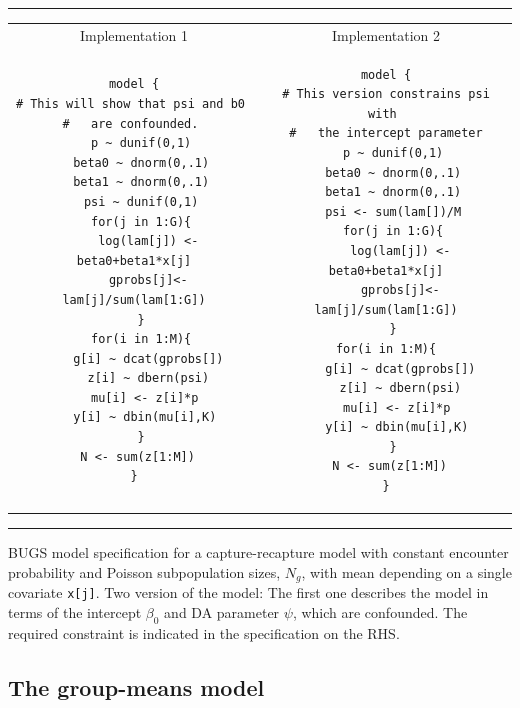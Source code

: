\begin{panel}[htp]   
\renewcommand{\baselinestretch}{1.0}
\centering
\rule[0.15in]{\textwidth}{.03in}
\begin{tabular}{cc}
Implementation 1 & Implementation 2 \\
\begin{minipage}{2.25in}
{\small
\begin{verbatim}
model {
# This will show that psi and b0 
#   are confounded. 
  p ~ dunif(0,1)
  beta0 ~ dnorm(0,.1)
  beta1 ~ dnorm(0,.1)
  psi ~ dunif(0,1)
  for(j in 1:G){
    log(lam[j]) <- beta0+beta1*x[j]
    gprobs[j]<-lam[j]/sum(lam[1:G])
  }
  for(i in 1:M){
    g[i] ~ dcat(gprobs[])
    z[i] ~ dbern(psi)
   mu[i] <- z[i]*p
   y[i] ~ dbin(mu[i],K)
  }
  N <- sum(z[1:M]) 
}
\end{verbatim}
}
\end{minipage}
&
\begin{minipage}{2.25in}
{\small
\begin{verbatim}
model {
# This version constrains psi with 
#   the intercept parameter
  p ~ dunif(0,1)
  beta0 ~ dnorm(0,.1)
  beta1 ~ dnorm(0,.1)
  psi <- sum(lam[])/M
  for(j in 1:G){
    log(lam[j]) <- beta0+beta1*x[j]
    gprobs[j]<-lam[j]/sum(lam[1:G])
  }
  for(i in 1:M){  
    g[i] ~ dcat(gprobs[])
    z[i] ~ dbern(psi)
   mu[i] <- z[i]*p
   y[i] ~ dbin(mu[i],K)
  }
  N <- sum(z[1:M]) 
}
\end{verbatim}
}
\end{minipage}
\end{tabular}
\rule[-0.15in]{\textwidth}{.03in}
\caption{BUGS model specification for a capture-recapture model with
  constant encounter probability and Poisson subpopulation sizes,
  $N_{g}$, with mean depending on a single covariate \mbox{\tt x[j]}. 
Two version of the model: The first one describes the model in terms
of the intercept $\beta_0$ and DA parameter $\psi$, which are
confounded. The required constraint is indicated in the specification
on the RHS. 
}
\label{panel.wbcode}
\end{panel}

\subsection{The group-means model}

